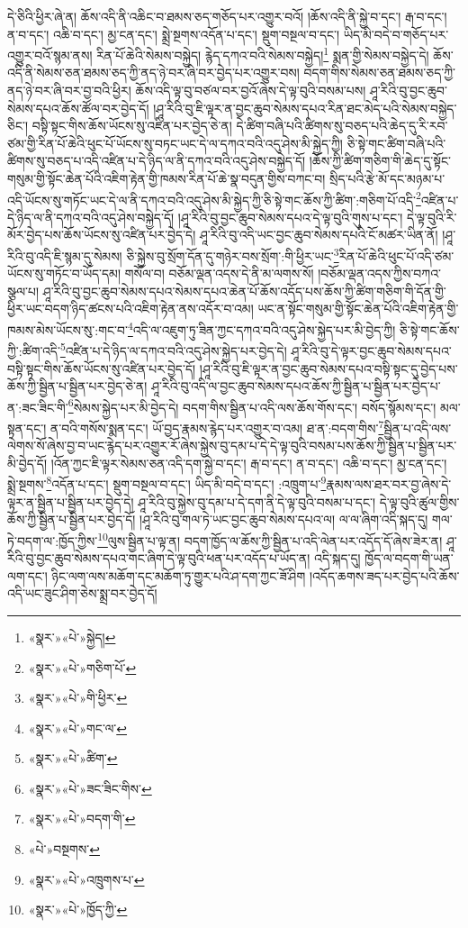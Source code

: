 དེ་ཅིའི་ཕྱིར་ཞེ་ན། ཆོས་འདི་ནི་འཆིང་བ་ཐམས་ཅད་གཅོད་པར་འགྱུར་བའོ། །ཆོས་འདི་ནི་སྐྱེ་བ་དང་། རྒ་བ་དང་། ན་བ་དང་། འཆི་བ་དང་། མྱ་ངན་དང་། སྨྲེ་སྔགས་འདོན་པ་དང་། སྡུག་བསྔལ་བ་དང་། ཡིད་མི་བདེ་བ་གཅོད་པར་འགྱུར་བའོ་སྙམ་ནས། རིན་པོ་ཆེའི་སེམས་བསྐྱེད། རྙེད་དཀའ་བའི་སེམས་བསྐྱེད།\footnote{«སྣར་»«པེ་»སྐྱེད།} སྨན་གྱི་སེམས་བསྐྱེད་དེ། ཆོས་འདི་ནི་སེམས་ཅན་ཐམས་ཅད་ཀྱི་ནད་ཉེ་བར་ཞི་བར་བྱེད་པར་འགྱུར་བས། བདག་གིས་སེམས་ཅན་ཐམས་ཅད་ཀྱི་ནད་ཉེ་བར་ཞི་བར་བྱ་བའི་ཕྱིར། ཆོས་འདི་ལྟ་བུ་བཙལ་བར་བྱའོ་ཞེས་དེ་ལྟ་བུའི་བསམ་པས། ཤཱ་རིའི་བུ་བྱང་ཆུབ་སེམས་དཔའ་ཆོས་ཚོལ་བར་བྱེད་དོ། །ཤཱ་རིའི་བུ་ཇི་ལྟར་ན་བྱང་ཆུབ་སེམས་དཔའ་རིན་ཐང་མེད་པའི་སེམས་བསྐྱེད་ཅིང་། བསྟི་སྟང་གིས་ཆོས་ཡོངས་སུ་འཛིན་པར་བྱེད་ཅེ་ན། དེ་ཚིག་བཞི་པའི་ཚིགས་སུ་བཅད་པའི་ཆེད་དུ་རི་རབ་ཙམ་གྱི་རིན་པོ་ཆེའི་ཕུང་པོ་ཡོངས་སུ་བཏང་ཡང་དེ་ལ་དཀའ་བའི་འདུ་ཤེས་མི་སྐྱེད་ཀྱི། ཅི་སྟེ་གང་ཚིག་བཞི་པའི་ཚིགས་སུ་བཅད་པ་འདི་འཛིན་པ་དེ་ཉིད་ལ་ནི་དཀའ་བའི་འདུ་ཤེས་བསྐྱེད་དོ། །ཆོས་ཀྱི་ཚིག་གཅིག་གི་ཆེད་དུ་སྟོང་གསུམ་གྱི་སྟོང་ཆེན་པོའི་འཇིག་རྟེན་གྱི་ཁམས་རིན་པོ་ཆེ་སྣ་བདུན་གྱིས་བཀང་བ། སྲིད་པའི་རྩེ་མོ་དང་མཉམ་པ་འདི་ཡོངས་སུ་གཏོང་ཡང་དེ་ལ་ནི་དཀའ་བའི་འདུ་ཤེས་མི་སྐྱེད་ཀྱི་ཅི་སྟེ་གང་ཆོས་ཀྱི་ཚིག་:གཅིག་པོ་འདི་\footnote{«སྣར་»«པེ་»གཅིག་པོ་}འཛིན་པ་དེ་ཉིད་ལ་ནི་དཀའ་བའི་འདུ་ཤེས་བསྐྱེད་དོ། །ཤཱ་རིའི་བུ་བྱང་ཆུབ་སེམས་དཔའ་དེ་ལྟ་བུའི་གུས་པ་དང་། དེ་ལྟ་བུའི་རི་མོར་བྱེད་པས་ཆོས་ཡོངས་སུ་འཛིན་པར་བྱེད་དེ། ཤཱ་རིའི་བུ་འདི་ཡང་བྱང་ཆུབ་སེམས་དཔའི་ངོ་མཚར་ཡིན་ནོ། །ཤཱ་རིའི་བུ་འདི་ཇི་སྙམ་དུ་སེམས། ཅི་སྐྱེས་བུ་སྲོག་དོན་དུ་གཉེར་བས་སྲོག་:གི་ཕྱིར་ཡང་\footnote{«སྣར་»«པེ་»གི་ཕྱིར་}རིན་པོ་ཆེའི་ཕུང་པོ་འདི་ཙམ་ཡོངས་སུ་གཏོང་བ་ཡོད་དམ། གསོལ་བ། བཅོམ་ལྡན་འདས་དེ་ནི་མ་ལགས་སོ། །བཅོམ་ལྡན་འདས་ཀྱིས་བཀའ་སྩལ་པ། ཤཱ་རིའི་བུ་བྱང་ཆུབ་སེམས་དཔའ་སེམས་དཔའ་ཆེན་པོ་ཆོས་འདོད་པས་ཆོས་ཀྱི་ཚིག་གཅིག་གི་དོན་གྱི་ཕྱིར་ཡང་བདག་ཉིད་ཚངས་པའི་འཇིག་རྟེན་ནས་འདོར་བ་འམ། ཡང་ན་སྟོང་གསུམ་གྱི་སྟོང་ཆེན་པོའི་འཇིག་རྟེན་གྱི་ཁམས་མེས་ཡོངས་སུ་:གང་བ་\footnote{«སྣར་»«པེ་»གང་ལ་}འདི་ལ་འཇུག་ཏུ་ཟིན་ཀྱང་དཀའ་བའི་འདུ་ཤེས་སྐྱེད་པར་མི་བྱེད་ཀྱི། ཅི་སྟེ་གང་ཆོས་ཀྱི་:ཚིག་འདི་\footnote{«སྣར་»«པེ་»ཚིག་}འཛིན་པ་དེ་ཉིད་ལ་དཀའ་བའི་འདུ་ཤེས་སྐྱེད་པར་བྱེད་དེ། ཤཱ་རིའི་བུ་དེ་ལྟར་བྱང་ཆུབ་སེམས་དཔའ་བསྟི་སྟང་གིས་ཆོས་ཡོངས་སུ་འཛིན་པར་བྱེད་དོ། །ཤཱ་རིའི་བུ་ཇི་ལྟར་ན་བྱང་ཆུབ་སེམས་དཔའ་བསྟི་སྟང་དུ་བྱེད་པས་ཆོས་ཀྱི་སྦྱིན་པ་སྦྱིན་པར་བྱེད་ཅེ་ན། ཤཱ་རིའི་བུ་འདི་ལ་བྱང་ཆུབ་སེམས་དཔའ་ཆོས་ཀྱི་སྦྱིན་པ་སྦྱིན་པར་བྱེད་པ་ན་:ཟང་ཟིང་གི་\footnote{«སྣར་»«པེ་»ཟང་ཟིང་གིས་}སེམས་སྐྱེད་པར་མི་བྱེད་དེ། བདག་གིས་སྦྱིན་པ་འདི་ལས་ཆོས་གོས་དང་། བསོད་སྙོམས་དང་། མལ་སྟན་དང་། ན་བའི་གསོས་སྨན་དང་། ཡོ་བྱད་རྣམས་རྙེད་པར་འགྱུར་བ་འམ། ཐ་ན་:བདག་གིས་\footnote{«སྣར་»«པེ་»བདག་གི་}སྦྱིན་པ་འདི་ལས་ལེགས་སོ་ཞེས་བྱ་བ་ཡང་རྙེད་པར་འགྱུར་རོ་ཞེས་སྐྱེས་བུ་དམ་པ་དེ་དེ་ལྟ་བུའི་བསམ་པས་ཆོས་ཀྱི་སྦྱིན་པ་སྦྱིན་པར་མི་བྱེད་དོ། །འོན་ཀྱང་ཇི་ལྟར་སེམས་ཅན་འདི་དག་སྐྱེ་བ་དང་། རྒ་བ་དང་། ན་བ་དང་། འཆི་བ་དང་། མྱ་ངན་དང་། སྨྲེ་སྔགས་\footnote{«པེ་»བསྔགས་}འདོན་པ་དང་། སྡུག་བསྔལ་བ་དང་། ཡིད་མི་བདེ་བ་དང་། :འཁྲུག་པ་\footnote{«སྣར་»«པེ་»འཁྲུགས་པ་}རྣམས་ལས་ཐར་བར་བྱ་ཞེས་དེ་ལྟར་ན་སྦྱིན་པ་སྦྱིན་པར་བྱེད་དེ། ཤཱ་རིའི་བུ་སྐྱེས་བུ་དམ་པ་དེ་དག་ནི་དེ་ལྟ་བུའི་བསམ་པ་དང་། དེ་ལྟ་བུའི་ཚུལ་གྱིས་ཆོས་ཀྱི་སྦྱིན་པ་སྦྱིན་པར་བྱེད་དོ། །ཤཱ་རིའི་བུ་གལ་ཏེ་ཡང་བྱང་ཆུབ་སེམས་དཔའ་ལ། ལ་ལ་ཞིག་འདི་སྐད་དུ། གལ་ཏེ་བདག་ལ་:ཁྱོད་ཀྱིས་\footnote{«སྣར་»«པེ་»ཁྱོད་ཀྱི་}ལུས་སྦྱིན་པ་ལྟ་ན། བདག་ཁྱོད་ལ་ཆོས་ཀྱི་སྦྱིན་པ་འདི་ལེན་པར་འདོད་དོ་ཞེས་ཟེར་ན། ཤཱ་རིའི་བུ་བྱང་ཆུབ་སེམས་དཔའ་གང་ཞིག་དེ་ལྟ་བུའི་ཕན་པར་འདོད་པ་ཡོད་ན། འདི་སྐད་དུ། ཁྱོད་ལ་བདག་གི་ཡན་ལག་དང་། ཉིང་ལག་ལས་མཆོག་དང་མཆོག་ཏུ་གྱུར་པའི་ཤ་དག་ཀྱང་ཟོ་ཤིག །འདོད་ཆགས་ཟད་པར་བྱེད་པའི་ཆོས་འདི་ཡང་ཟུང་ཤིག་ཅེས་སྨྲ་བར་བྱེད་དོ། 